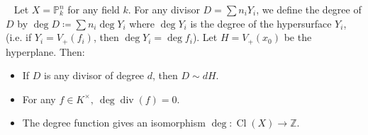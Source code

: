 \documentclass[11pt,a4paper,footinclude=true,headinclude=true]{scrbook} %
\DeclareMathOperator{\Cl}{Cl}
\DeclareMathOperator{\dv}{div}
\newcommand{\PP}{\mathbb{P}}
\newcommand{\<}{\langle}
\newcommand{\>}{\rangle}
\newenvironment{proposition}[2][]
{\renewcommand\theinnercustomprop{#2}\innercustomprop[#1] 
\begin{mdframed}[backgroundcolor=gray!20]\ }
{\end{mdframed}\endinnercustomprop}
\begin{document}
\begin{proposition}{6.4}
    Let $X=\PP_k^n$ for any field $k$. For any divisor $D=\sum n_iY_i$, we define the degree of $D$ by $\deg D\coloneqq\sum n_i\deg Y_i$ where $\deg Y_i$ is the degree of the hypersurface $Y_i$, (i.e. if $Y_i=V_+(f_i)$, then $\deg Y_i=\deg f_i$). Let $H=V_+(x_0)$ be the hyperplane. Then:
    \begin{itemize}
        \item[(a)] If $D$ is any divisor of degree $d$, then $D\sim dH$.
        \item[(b)] For any $f\in K^\times,\ \deg\dv(f)=0$.
        \item[(c)] The degree function gives an isomorphism $\deg:\Cl(X)\to\mathbb{Z}$.
    \end{itemize}
\end{proposition}
\end{document}
